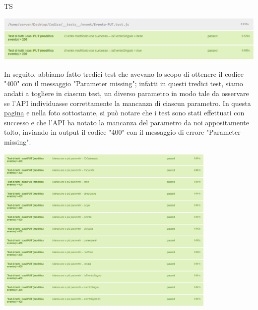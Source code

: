 \begin{listaPersonale}{TS}
                \begin{center}
                        \includegraphics[width=1\textwidth, height=0.1\textheight]{img/png/tests/EventoPut/200_PutEvento.png}
                \end{center}
                In seguito, abbiamo fatto tredici test che avevano lo scopo di ottenere il codice "400" con il messaggio "Parameter missing"; infatti in questi tredici test, siamo andati a togliere in ciascun test, un diverso parametro in modo tale da osservare se l'API individuasse correttamente la mancanza di ciascun parametro. In questa \href{https://plan-it.it/test-report.html} {pagina} e nella foto sottostante, si può notare che i test sono stati effettuati con successo e che l'API ha notato la mancanza del parametro da noi appositamente tolto, inviando in output il codice "400" con il messaggio di errore "Parameter missing".
                \begin{center}
                        \includegraphics[width=0.8\textwidth, height=0.37\textheight]{img/png/tests/EventoPut/400_missingParameter_PutEvento.png}

\end{center}
\end{listaPersonale}
